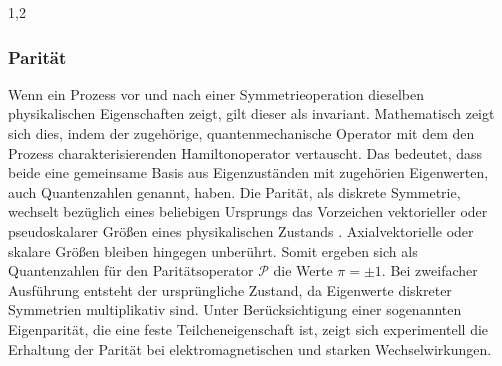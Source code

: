\documentclass[11pt,a4paper,twoside,draft]{report}
\begin{document}
\begin{spacing}{1,2}
\subsubsection{Parität}
\label{sec_parity}
Wenn ein Prozess vor und nach einer Symmetrieoperation dieselben physikalischen Eigenschaften zeigt, gilt dieser als invariant. Mathematisch zeigt sich
dies, indem der zugehörige, quantenmechanische Operator mit dem den Prozess charakterisierenden Hamiltonoperator vertauscht. Das bedeutet, dass beide eine
gemeinsame Basis aus Eigenzuständen mit zugehörien Eigenwerten, auch Quantenzahlen genannt, haben. Die Parität, als diskrete Symmetrie, wechselt bezüglich 
eines beliebigen Ursprungs das Vorzeichen vektorieller oder pseudoskalarer Größen eines physikalischen Zustands \cite{Klapdor}. Axialvektorielle oder skalare Größen bleiben
hingegen unberührt. Somit ergeben sich als Quantenzahlen für den Paritätsoperator $\mathcal{P}$ die Werte $\pi = \pm1$. Bei zweifacher Ausführung entsteht 
der ursprüngliche Zustand, da Eigenwerte diskreter Symmetrien multiplikativ sind. Unter Berücksichtigung einer sogenannten Eigenparität, die eine feste
Teilcheneigenschaft ist, zeigt sich experimentell die Erhaltung der Parität bei elektromagnetischen und starken Wechselwirkungen.


\end{spacing}
\end{document}
